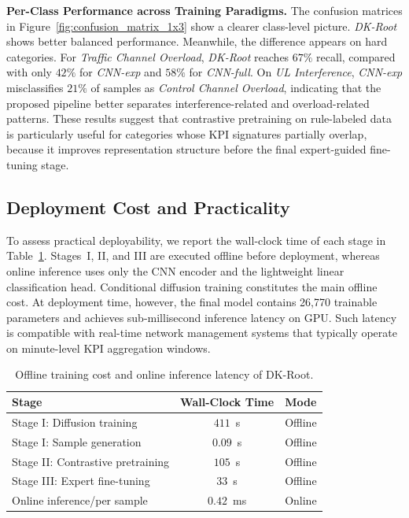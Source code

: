 \documentclass[lettersize,journal]{IEEEtran}
\begin{document}
{{\noindent\textbf{Per-Class Performance across Training Paradigms.}
The confusion matrices in Figure~\ref{fig:confusion_matrix_1x3} show a clearer class-level picture. \textit{DK-Root} shows better balanced performance. Meanwhile, the difference appears on hard categories. For \textit{Traffic Channel Overload}, \textit{DK-Root} reaches $67\%$ recall, compared with only $42\%$ for \textit{CNN-exp} and $58\%$ for \textit{CNN-full}. On \textit{UL Interference}, \textit{CNN-exp} misclassifies $21\%$ of samples as \textit{Control Channel Overload}, indicating that the proposed pipeline better separates interference-related and overload-related patterns. These results suggest that contrastive pretraining on rule-labeled data is particularly useful for categories whose KPI signatures partially overlap, because it improves representation structure before the final expert-guided fine-tuning stage.

}

\subsection{Deployment Cost and Practicality}
\label{sec:deployment}
{\color{R2color}To assess practical deployability, we report the wall-clock time of each stage in Table~\ref{tab:runtime}. Stages~I, II, and III are executed offline before deployment, whereas online inference uses only the CNN encoder and the lightweight linear classification head.}
Conditional diffusion training constitutes the main offline cost. At deployment time, however, the final model contains 26,770 trainable parameters and achieves sub-millisecond inference latency on GPU. Such latency is compatible with real-time network management systems that typically operate on minute-level KPI aggregation windows.

{\color{R2color}
\begin{table}[!b]
\centering
\caption{{\color{R2color}Offline training cost and online inference latency of DK-Root.}}
\label{tab:runtime}
\begin{tabular}{lcc}
\toprule
\textbf{Stage} & \textbf{Wall-Clock Time} & \textbf{Mode} \\
\midrule
Stage I: Diffusion training        & $411$~s         & Offline  \\
Stage I: Sample generation         & $0.09$~s       & Offline  \\
Stage II: Contrastive pretraining  & $105$~s          & Offline  \\
Stage III: Expert fine-tuning      & $33$~s          & Offline  \\
\midrule
Online inference/per sample &       $0.42$~ms      & Online \\
\bottomrule
\end{tabular}
\end{table}
}


}
\end{document}
